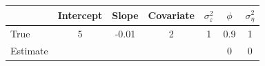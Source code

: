 \begin{tabular}{lcccccc}
\toprule
& Intercept & Slope & Covariate & $\sigma_\varepsilon^2$ & $\phi$ & $\sigma_\eta^2$ \\
\midrule
True & 5 & -0.01 & 2 & 1 & 0.9 & 1 \\
Estimate &       &       &       &       &    0   &    0   \\
\bottomrule
\end{tabular}
